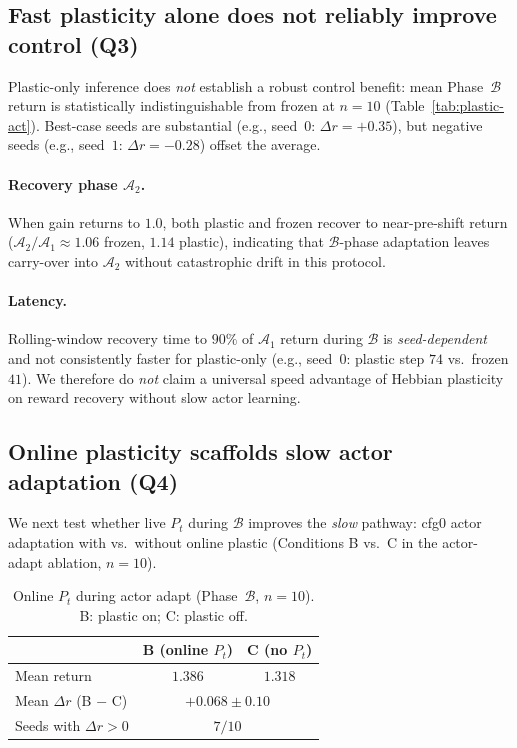 \subsection{Fast plasticity alone does not reliably improve control (Q3)}
\label{sec:exp-plastic-only}

Plastic-only inference does \emph{not} establish a robust control benefit: mean Phase~$\mathcal{B}$ return is statistically indistinguishable from frozen at $n{=}10$ (Table~\ref{tab:plastic-act}).
Best-case seeds are substantial (e.g., seed~$0$: $\Delta r {=} +0.35$), but negative seeds (e.g., seed~$1$: $\Delta r {=} -0.28$) offset the average.

\paragraph{Recovery phase $\mathcal{A}_2$.}
When gain returns to $1.0$, both plastic and frozen recover to near-pre-shift return ($\mathcal{A}_2/\mathcal{A}_1 \approx 1.06$ frozen, $1.14$ plastic), indicating that $\mathcal{B}$-phase adaptation leaves carry-over into $\mathcal{A}_2$ without catastrophic drift in this protocol.

\paragraph{Latency.}
Rolling-window recovery time to $90\%$ of $\mathcal{A}_1$ return during $\mathcal{B}$ is \emph{seed-dependent} and not consistently faster for plastic-only (e.g., seed~$0$: plastic step $74$ vs.\ frozen $41$).
We therefore do \emph{not} claim a universal speed advantage of Hebbian plasticity on reward recovery without slow actor learning.

\subsection{Online plasticity scaffolds slow actor adaptation (Q4)}
\label{sec:exp-bc}

We next test whether live $P_t$ during $\mathcal{B}$ improves the \emph{slow} pathway: cfg0 actor adaptation with vs.\ without online plastic (Conditions B vs.\ C in the actor-adapt ablation, $n{=}10$).

\begin{table}[t]
  \centering
  \caption{Online $P_t$ during actor adapt (Phase~$\mathcal{B}$, $n{=}10$). B: plastic on; C: plastic off.}
  \label{tab:bc}
  \begin{tabular}{@{}lcc@{}}
    \toprule
    & B (online $P_t$) & C (no $P_t$) \\
    \midrule
    Mean return & $1.386$ & $1.318$ \\
    Mean $\Delta r$ (B $-$ C) & \multicolumn{2}{c}{$+0.068 \pm 0.10$} \\
    Seeds with $\Delta r > 0$ & \multicolumn{2}{c}{$7/10$} \\
    \bottomrule
  \end{tabular}
\end{table}

